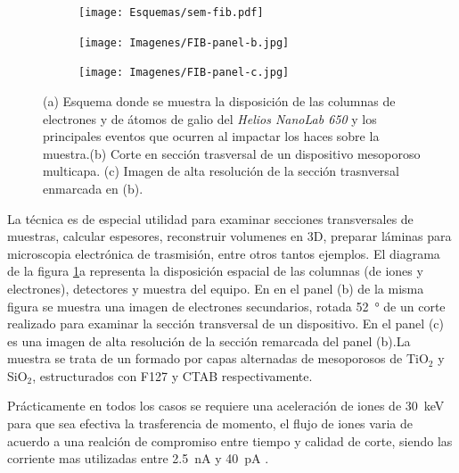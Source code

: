 			\begin{figure}[b!]
			  		  \begin{subfigure}[t]{\textwidth}
			  		  \centering\texttt{[image: Esquemas/sem-fib.pdf]}
			  		  \end{subfigure}
			  		  \begin{subfigure}[t]{0.498\textwidth}
			  		  \texttt{[image: Imagenes/FIB-panel-b.jpg]}
			  		  \end{subfigure}
			  		  \begin{subfigure}[t]{0.498\textwidth}
			  		  \texttt{[image: Imagenes/FIB-panel-c.jpg]}
			  		  \end{subfigure}
			  		  \caption[Esquema de las microscopia\index{microscopía}s FIB/SEM]{(a) Esquema donde se muestra la disposición de las columnas de electrones y de átomos de galio del \textit{Helios NanoLab 650} y los principales eventos que ocurren al impactar los haces sobre la muestra.(b) Corte en sección trasversal de un dispositivo mesoporoso multicapa. (c) Imagen de alta resolución de la sección trasnversal enmarcada en (b).}
			  		  \label{esq:sem-fib}
			  		  \end{figure}

		La técnica es de especial utilidad para examinar secciones transversales de muestras, calcular espesores, reconstruir volumenes en 3D, preparar láminas para microscopia electrónica de trasmisión, entre otros tantos ejemplos. El diagrama de la figura \ref{esq:sem-fib}a representa la disposición espacial de las columnas (de iones y electrones), detectores y muestra del equipo. En en el panel (b) de la misma figura se muestra una imagen de electrones secundarios, rotada \SI{52}{\degree} de un corte realizado para examinar la sección transversal de un dispositivo. En el panel (c) es una imagen de alta resolución de la sección remarcada del panel (b).La muestra se trata de un formado por capas alternadas de mesoporosos de TiO$_2$ y SiO$_2$, estructurados con F127 y CTAB respectivamente.\cite{Gimenez2017}

		Prácticamente en todos los casos se requiere una aceleración de iones de \SI{30}{\kilo\electronvolt} para que sea efectiva la trasferencia de momento, el flujo de iones varia de acuerdo a una realción de compromiso entre tiempo y calidad de corte, siendo las corriente mas utilizadas entre \SI{2.5}{\nano\ampere} y \SI{40}{\pico\ampere} \cite{Orloff2003,Reyntjens2001}.

